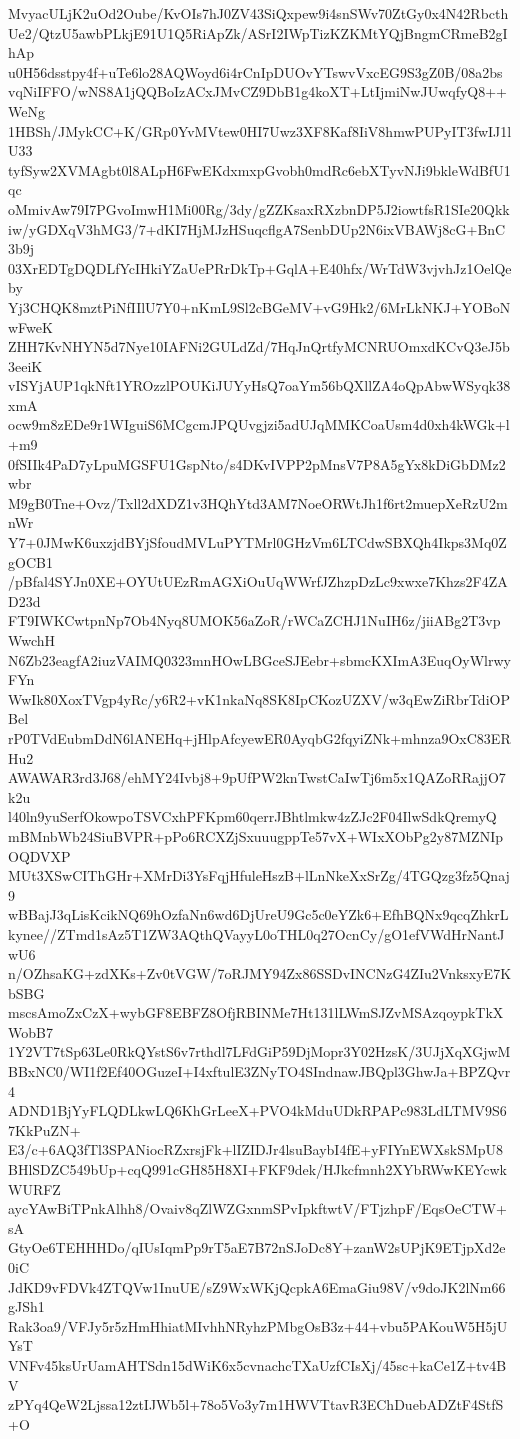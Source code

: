 MvyacULjK2uOd2Oube/KvOIs7hJ0ZV43SiQxpew9i4snSWv70ZtGy0x4N42Rbcth
Ue2/QtzU5awbPLkjE91U1Q5RiApZk/ASrI2IWpTizKZKMtYQjBngmCRmeB2gIhAp
u0H56dsstpy4f+uTe6lo28AQWoyd6i4rCnIpDUOvYTswvVxcEG9S3gZ0B/08a2bs
vqNiIFFO/wNS8A1jQQBoIzACxJMvCZ9DbB1g4koXT+LtIjmiNwJUwqfyQ8++WeNg
1HBSh/JMykCC+K/GRp0YvMVtew0HI7Uwz3XF8Kaf8IiV8hmwPUPyIT3fwIJ1lU33
tyfSyw2XVMAgbt0l8ALpH6FwEKdxmxpGvobh0mdRc6ebXTyvNJi9bkleWdBfU1qc
oMmivAw79I7PGvoImwH1Mi00Rg/3dy/gZZKsaxRXzbnDP5J2iowtfsR1SIe20Qkk
iw/yGDXqV3hMG3/7+dKI7HjMJzHSuqcflgA7SenbDUp2N6ixVBAWj8cG+BnC3b9j
03XrEDTgDQDLfYcIHkiYZaUePRrDkTp+GqlA+E40hfx/WrTdW3vjvhJz1OelQeby
Yj3CHQK8mztPiNfIIlU7Y0+nKmL9Sl2cBGeMV+vG9Hk2/6MrLkNKJ+YOBoNwFweK
ZHH7KvNHYN5d7Nye10IAFNi2GULdZd/7HqJnQrtfyMCNRUOmxdKCvQ3eJ5b3eeiK
vISYjAUP1qkNft1YROzzlPOUKiJUYyHsQ7oaYm56bQXllZA4oQpAbwWSyqk38xmA
ocw9m8zEDe9r1WIguiS6MCgcmJPQUvgjzi5adUJqMMKCoaUsm4d0xh4kWGk+l+m9
0fSIIk4PaD7yLpuMGSFU1GspNto/s4DKvIVPP2pMnsV7P8A5gYx8kDiGbDMz2wbr
M9gB0Tne+Ovz/Txll2dXDZ1v3HQhYtd3AM7NoeORWtJh1f6rt2muepXeRzU2mnWr
Y7+0JMwK6uxzjdBYjSfoudMVLuPYTMrl0GHzVm6LTCdwSBXQh4Ikps3Mq0ZgOCB1
/pBfal4SYJn0XE+OYUtUEzRmAGXiOuUqWWrfJZhzpDzLc9xwxe7Khzs2F4ZAD23d
FT9IWKCwtpnNp7Ob4Nyq8UMOK56aZoR/rWCaZCHJ1NuIH6z/jiiABg2T3vpWwchH
N6Zb23eagfA2iuzVAIMQ0323mnHOwLBGceSJEebr+sbmcKXImA3EuqOyWlrwyFYn
WwIk80XoxTVgp4yRc/y6R2+vK1nkaNq8SK8IpCKozUZXV/w3qEwZiRbrTdiOPBel
rP0TVdEubmDdN6lANEHq+jHlpAfcyewER0AyqbG2fqyiZNk+mhnza9OxC83ERHu2
AWAWAR3rd3J68/ehMY24Ivbj8+9pUfPW2knTwstCaIwTj6m5x1QAZoRRajjO7k2u
l40ln9yuSerfOkowpoTSVCxhPFKpm60qerrJBhtlmkw4zZJc2F04IlwSdkQremyQ
mBMnbWb24SiuBVPR+pPo6RCXZjSxuuugppTe57vX+WIxXObPg2y87MZNIpOQDVXP
MUt3XSwCIThGHr+XMrDi3YsFqjHfuleHszB+lLnNkeXxSrZg/4TGQzg3fz5Qnaj9
wBBajJ3qLisKcikNQ69hOzfaNn6wd6DjUreU9Gc5c0eYZk6+EfhBQNx9qcqZhkrL
kynee//ZTmd1sAz5T1ZW3AQthQVayyL0oTHL0q27OcnCy/gO1efVWdHrNantJwU6
n/OZhsaKG+zdXKs+Zv0tVGW/7oRJMY94Zx86SSDvINCNzG4ZIu2VnksxyE7KbSBG
mscsAmoZxCzX+wybGF8EBFZ8OfjRBINMe7Ht131lLWmSJZvMSAzqoypkTkXWobB7
1Y2VT7tSp63Le0RkQYstS6v7rthdl7LFdGiP59DjMopr3Y02HzsK/3UJjXqXGjwM
BBxNC0/WI1f2Ef40OGuzeI+I4xftulE3ZNyTO4SIndnawJBQpl3GhwJa+BPZQvr4
ADND1BjYyFLQDLkwLQ6KhGrLeeX+PVO4kMduUDkRPAPc983LdLTMV9S67KkPuZN+
E3/c+6AQ3fTl3SPANiocRZxrsjFk+lIZIDJr4lsuBaybI4fE+yFIYnEWXskSMpU8
BHlSDZC549bUp+cqQ991cGH85H8XI+FKF9dek/HJkcfmnh2XYbRWwKEYcwkWURFZ
aycYAwBiTPnkAlhh8/Ovaiv8qZlWZGxnmSPvIpkftwtV/FTjzhpF/EqsOeCTW+sA
GtyOe6TEHHHDo/qIUsIqmPp9rT5aE7B72nSJoDc8Y+zanW2sUPjK9ETjpXd2e0iC
JdKD9vFDVk4ZTQVw1InuUE/sZ9WxWKjQcpkA6EmaGiu98V/v9doJK2lNm66gJSh1
Rak3oa9/VFJy5r5zHmHhiatMIvhhNRyhzPMbgOsB3z+44+vbu5PAKouW5H5jUYsT
VNFv45ksUrUamAHTSdn15dWiK6x5cvnachcTXaUzfCIsXj/45sc+kaCe1Z+tv4BV
zPYq4QeW2Ljssa12ztIJWb5l+78o5Vo3y7m1HWVTtavR3EChDuebADZtF4StfS+O
